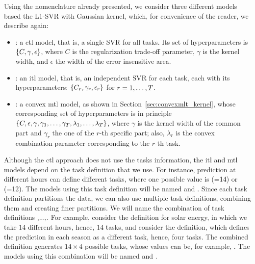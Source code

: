 %
Using the nomenclature already presented, we consider three different models based the L1-SVR with Gaussian kernel, which, for convenience of the reader, we describe again:
\begin{itemize}
    \item {}: a \acrshort{ctl} model, that is, a single SVR for all tasks. Its set of hyperparameters is $\left\{C, \gamma, \epsilon\right\}$, where $C$ is the regularization trade-off parameter, $\gamma$ is the kernel width, and $\epsilon$ the width of the error insensitive area.
    \item {}: an \acrshort{itl} model, that is, an independent SVR for each task, each with its hyperparameters: $\left\{C_r, \gamma_r, \epsilon_r\right\}$ for $r=1, \ldots, T$.
    \item {}: a convex \acrshort{mtl} model, as shown in Section~\ref{sec:convexmlt_kernel}, whose corresponding set of hyperparameters is in principle $\left\{C, \epsilon, \gamma, \gamma_1, \ldots, \gamma_T, \lambda_1, \ldots, \lambda_T\right\}$, where $\gamma$ is the kernel width of the common part and $\gamma_r$ the one of the $r$-th specific part; also, $\lambda_r$ is the convex combination parameter corresponding to the $r$-th task.
\end{itemize}
%
Although the \acrshort{ctl} approach does not use the tasks information, the \acrshort{itl} and \acrshort{mtl} models depend on the task definition that we use. For instance, prediction at different hours can define different tasks, where one possible value is (=14) or (=12). The models using this task definition will be named  and . 
%
Since each task definition partitions the data, we can also use multiple task definitions, combining them and creating finer partitions. 
We will name  the combination of task definitions ,...,. For example, consider the  definition for solar energy, in which we take $14$ different hours, hence, $14$ tasks, and consider the  definition, which defines the prediction in each season as a different task, hence, four tasks. The combined definition  generates $14 \times 4$ possible tasks, whose values can be, for example, .
The models using this combination will be named  and .


